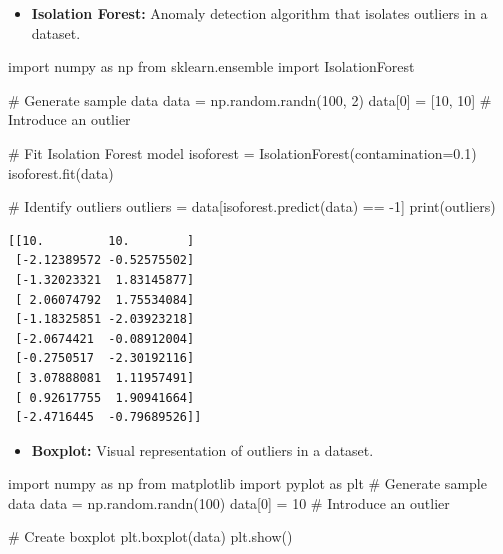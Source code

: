 \documentclass[
  letterpaper,
  DIV=11,
  numbers=noendperiod]{scrreprt}
\newenvironment{Shaded}{\begin{snugshade}}{\end{snugshade}}
\newcommand{\BuiltInTok}[1]{\textcolor[rgb]{0.00,0.23,0.31}{#1}}
\newcommand{\CommentTok}[1]{\textcolor[rgb]{0.37,0.37,0.37}{#1}}
\newcommand{\DecValTok}[1]{\textcolor[rgb]{0.68,0.00,0.00}{#1}}
\newcommand{\FloatTok}[1]{\textcolor[rgb]{0.68,0.00,0.00}{#1}}
\newcommand{\ImportTok}[1]{\textcolor[rgb]{0.00,0.46,0.62}{#1}}
\newcommand{\NormalTok}[1]{\textcolor[rgb]{0.00,0.23,0.31}{#1}}
\newcommand{\OperatorTok}[1]{\textcolor[rgb]{0.37,0.37,0.37}{#1}}
\providecommand{\tightlist}{%
  \setlength{\itemsep}{0pt}\setlength{\parskip}{0pt}}\usepackage{longtable,booktabs,array}
\begin{document}
\begin{itemize}
\tightlist
\item
  \textbf{Isolation Forest:} Anomaly detection algorithm that isolates
  outliers in a dataset.
\end{itemize}

\begin{Shaded}
\begin{Highlighting}[]
\ImportTok{import}\NormalTok{ numpy }\ImportTok{as}\NormalTok{ np}
\ImportTok{from}\NormalTok{ sklearn.ensemble }\ImportTok{import}\NormalTok{ IsolationForest}

\CommentTok{\# Generate sample data}
\NormalTok{data }\OperatorTok{=}\NormalTok{ np.random.randn(}\DecValTok{100}\NormalTok{, }\DecValTok{2}\NormalTok{)}
\NormalTok{data[}\DecValTok{0}\NormalTok{] }\OperatorTok{=}\NormalTok{ [}\DecValTok{10}\NormalTok{, }\DecValTok{10}\NormalTok{]  }\CommentTok{\# Introduce an outlier}

\CommentTok{\# Fit Isolation Forest model}
\NormalTok{isoforest }\OperatorTok{=}\NormalTok{ IsolationForest(contamination}\OperatorTok{=}\FloatTok{0.1}\NormalTok{)}
\NormalTok{isoforest.fit(data)}

\CommentTok{\# Identify outliers}
\NormalTok{outliers }\OperatorTok{=}\NormalTok{ data[isoforest.predict(data) }\OperatorTok{==} \OperatorTok{{-}}\DecValTok{1}\NormalTok{]}
\BuiltInTok{print}\NormalTok{(outliers)}
\end{Highlighting}
\end{Shaded}

\begin{verbatim}
[[10.         10.        ]
 [-2.12389572 -0.52575502]
 [-1.32023321  1.83145877]
 [ 2.06074792  1.75534084]
 [-1.18325851 -2.03923218]
 [-2.0674421  -0.08912004]
 [-0.2750517  -2.30192116]
 [ 3.07888081  1.11957491]
 [ 0.92617755  1.90941664]
 [-2.4716445  -0.79689526]]
\end{verbatim}

\begin{itemize}
\tightlist
\item
  \textbf{Boxplot:} Visual representation of outliers in a dataset.
\end{itemize}

\begin{Shaded}
\begin{Highlighting}[]
\ImportTok{import}\NormalTok{ numpy }\ImportTok{as}\NormalTok{ np}
\ImportTok{from}\NormalTok{ matplotlib }\ImportTok{import}\NormalTok{ pyplot }\ImportTok{as}\NormalTok{ plt}
\CommentTok{\# Generate sample data\textquotesingle{}}
\NormalTok{data }\OperatorTok{=}\NormalTok{ np.random.randn(}\DecValTok{100}\NormalTok{)}
\NormalTok{data[}\DecValTok{0}\NormalTok{] }\OperatorTok{=} \DecValTok{10}  \CommentTok{\# Introduce an outlier}

\CommentTok{\# Create boxplot}
\NormalTok{plt.boxplot(data)}
\NormalTok{plt.show()}
\end{Highlighting}
\end{Shaded}
\end{document}
